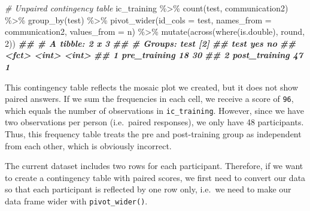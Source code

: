 \documentclass[
]{book}
\newenvironment{Shaded}{\begin{snugshade}}{\end{snugshade}}
\newcommand{\AttributeTok}[1]{\textcolor[rgb]{0.77,0.63,0.00}{#1}}
\newcommand{\CommentTok}[1]{\textcolor[rgb]{0.56,0.35,0.01}{\textit{#1}}}
\newcommand{\DecValTok}[1]{\textcolor[rgb]{0.00,0.00,0.81}{#1}}
\newcommand{\DocumentationTok}[1]{\textcolor[rgb]{0.56,0.35,0.01}{\textbf{\textit{#1}}}}
\newcommand{\FunctionTok}[1]{\textcolor[rgb]{0.00,0.00,0.00}{#1}}
\newcommand{\NormalTok}[1]{#1}
\newcommand{\SpecialCharTok}[1]{\textcolor[rgb]{0.00,0.00,0.00}{#1}}
\begin{document}
\begin{Shaded}
\begin{Highlighting}[]
\CommentTok{\# Unpaired contingency table}
\NormalTok{ic\_training }\SpecialCharTok{\%\textgreater{}\%}
  \FunctionTok{count}\NormalTok{(test, communication2) }\SpecialCharTok{\%\textgreater{}\%}
  \FunctionTok{group\_by}\NormalTok{(test) }\SpecialCharTok{\%\textgreater{}\%}
  \FunctionTok{pivot\_wider}\NormalTok{(}\AttributeTok{id\_cols =}\NormalTok{ test,}
              \AttributeTok{names\_from =}\NormalTok{ communication2,}
              \AttributeTok{values\_from =}\NormalTok{ n) }\SpecialCharTok{\%\textgreater{}\%}
  \FunctionTok{mutate}\NormalTok{(}\FunctionTok{across}\NormalTok{(}\FunctionTok{where}\NormalTok{(is.double), round, }\DecValTok{2}\NormalTok{))}
\DocumentationTok{\#\# \# A tibble: 2 x 3}
\DocumentationTok{\#\# \# Groups:   test [2]}
\DocumentationTok{\#\#   test            yes    no}
\DocumentationTok{\#\#   \textless{}fct\textgreater{}         \textless{}int\textgreater{} \textless{}int\textgreater{}}
\DocumentationTok{\#\# 1 pre\_training     18    30}
\DocumentationTok{\#\# 2 post\_training    47     1}
\end{Highlighting}
\end{Shaded}

This contingency table reflects the mosaic plot we created, but it does not show paired answers. If we sum the frequencies in each cell, we receive a score of \texttt{96}, which equals the number of observations in \texttt{ic\_training}. However, since we have two observations per person (i.e.~paired responses), we only have 48 participants. Thus, this frequency table treats the pre and post-training group as independent from each other, which is obviously incorrect.

The current dataset includes two rows for each participant. Therefore, if we want to create a contingency table with paired scores, we first need to convert our data so that each participant is reflected by one row only, i.e.~we need to make our data frame wider with \texttt{pivot\_wider()}.
\end{document}
